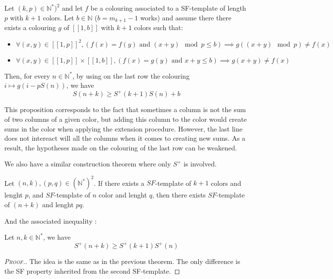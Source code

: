 \begin{proposition}
Let \((k, p) \in \mathbb{N}^*)^2\) and let \(f\) be a colouring associated to a SF-template of length \(p\) with \(k+1\) 
colors. Let \(b \in \mathbb{N}\) (\(b = m_{k+1} - 1\) works) and assume there there exists a colouring \(g\) of 
\([\![1, b]\!]\) with \(k+1\) colors such that:

\begin{itemize}
	\item \(\forall (x, y) \in [\![1, p]\!]^2,(f(x) = f(y) \text{ and } (x + y) \mod p \leqslant b) 
	\implies g((x + y) \mod p) \neq f(x)\)
	\item \(\forall (x, y) \in [\![1, p]\!] \times  [\![1, b]\!], (f(x) = g(y) \text{ and } x + y \leqslant b) 
	\implies g(x + y) \neq f(x)\)
\end{itemize}

Then, for every \(n \in \mathbb{N}^*\), by using on the last row the colouring \(i \longmapsto g(i - p S(n))\), we have
\[ S(n+k) \geqslant S^+(k+1)S(n) + b\]
\end{proposition}

This proposition corresponds to the fact that sometimes a column is not the sum of two columns of a given color, but adding this 
column to the color would create sums in the color when applying the extension procedure. However, the last line does not 
intereact will all the columns when it comes to creating new sums. As a result, the hypotheses made on the colouring of the last 
row can be weakened.

We also have a similar construction theorem where only \(S^+\) is involved.

\begin{theorem}
	Let \((n,k), (p,q) \in (\mathbb{N}^*)^2\). If there exists a \(SF\)-template of \(k+1\) colors and lenght \(p\),
	and \(SF\)-template of \(n\) color and lenght \(q\), then there exists \(SF\)-template of \((n+k)\) and lenght \(pq\).
\end{theorem}

And the associated inequality :

\begin{corollary}
	Let \(n, k \in \mathbb{N}^*\), we have \\
	\[ S^+(n+k) \geqslant S^+(k+1)S^+(n) \]
\end{corollary}

\begin{proof}[\textsc{Proof.}]
The idea is the same as in the previous theorem. The only difference is the SF property inherited 
from the second SF-template.
\end{proof}


